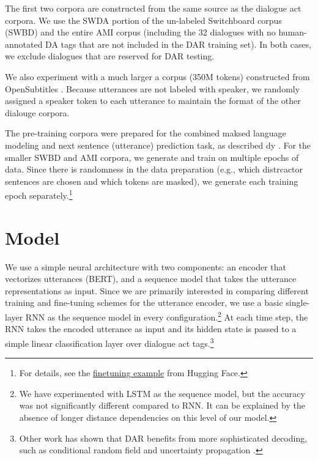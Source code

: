 \documentclass[11pt,a4paper]{article}
\begin{document}
The first two corpora are constructed from the same source as the dialogue act corpora.
We use the SWDA portion of the un-labeled Switchboard corpus (SWBD) and the entire AMI corpus (including the 32 dialogues with no human-annotated DA tags that are not included in the DAR training set).
In both cases, we exclude dialogues that are reserved for DAR testing.

We also experiment with a much larger a corpus (350M tokens) constructed from OpenSubtitles \citep{Lison2016}.
Because utterances are not labeled with speaker, we randomly assigned a speaker token to each utterance to maintain the format of the other dialouge corpora.

The pre-training corpora were prepared for the combined maksed language modeling and next sentence (utterance) prediction task, as described dy \citet{devlinBERTPretrainingDeep2018}.
For the smaller SWBD and AMI corpora, we generate and train on multiple epochs of data. Since there is randomness in the data preparation (e.g., which distrcactor sentences are chosen and which tokens are masked), we generate each training epoch separately.\footnote{For details, see the \href{https://github.com/huggingface/transformers/tree/1.1.0/examples/lm_finetuning}{finetuning example} from Hugging Face.}

\section{Model} %

We use a simple neural architecture with two components: 
an encoder that vectorizes utterances (BERT), 
and a sequence model that takes the utterance representations as input.
Since we are primarily interested in comparing different training and fine-tuning schemes for the utterance encoder, 
we use a basic single-layer RNN as the sequence model in every configuration.\footnote{We have experimented with LSTM as the sequence model, but the accuracy was not significantly different compared to RNN. It can be explained by the absence of longer distance dependencies on this level of our model.}
At each time step, the RNN takes the encoded utterance as input 
and its hidden state is passed to a simple linear classification layer over dialogue act tags.\footnote{
Other work has shown that DAR benefits from more sophisticated decoding, such as conditional random field \citep{chenDialogueActRecognition2017} and uncertainty propagation \citep{tranPreservingDistributionalInformation2017}.}
\end{document}
